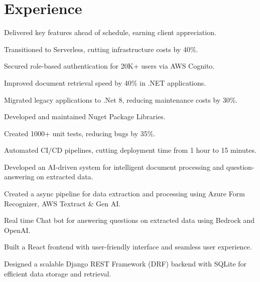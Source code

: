\documentclass[]{deedy-resume-reversed}
\begin{document}
\begin{minipage}[t]{0.60\textwidth}


\section{Experience}
\vspace{\topsep} %
\begin{tightemize}
\item Delivered key features ahead of schedule, earning client appreciation.
\item Transitioned to Serverless, cutting infrastructure costs by 40\%.
\item Secured role-based authentication for 20K+ users via AWS Cognito.
\item Improved document retrieval speed by 40\% in .NET applications.
\item Migrated legacy applications to .Net 8, reducing maintenance costs by 30\%.
\item Developed and maintained Nuget Package Libraries.
\item Created 1000+ unit tests, reducing bugs by 35\%.
\item Automated CI/CD pipelines, cutting deployment time from 1 hour to 15 minutes.

\end{tightemize}
\sectionsep

\begin{tightemize}
\item Developed an AI-driven system for intelligent document processing and question-answering on extracted data.
\item Created a async pipeline for data extraction and processing using Azure Form Recognizer, AWS Textract \& Gen AI.
\item Real time Chat bot for answering questions on extracted data using Bedrock and OpenAI.
\item Built a React frontend with user-friendly interface and seamless user experience.
\item Designed a scalable Django REST Framework (DRF) backend with SQLite for efficient data storage and retrieval.
\end{tightemize}
\sectionsep


\end{minipage}
\end{document}
